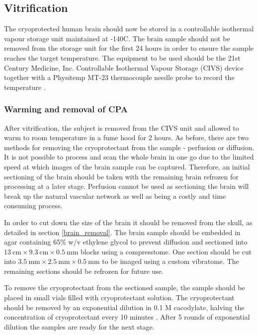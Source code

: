 \documentclass[a4paper, 11pt]{article}
\numberwithin{equation}{section}
\begin{document}
\subsection{Vitrification}

	\label{Vitrification}

The cryoprotected human brain should now be stored in a controllable isothermal vapour storage unit maintained at -140\degree C. The brain sample should not be removed from the storage unit for the first 24 hours in order to ensure the sample reaches the target temperature. The equipment to be used should be the 21st Century Medicine, Inc. Controllable Isothermal Vapour Storage (CIVS) device together with a Physitemp MT-23 thermocouple needle probe to record the temperature \cite{Aldehyde_stabilized_cryopreservation}. 

\subsubsection{Warming and removal of CPA}
	\label{Warming}

After vitrification, the subject is removed from the CIVS unit and allowed to warm to room temperature in a fume hood for 2 hours. As before, there are two methods for removing the cryoprotectant from the sample - perfusion or diffusion. It is not possible to process and scan the whole brain in one go due to the limited speed at which images of the brain sample can be captured. Therefore, an initial sectioning of the brain should be taken with the remaining brain refrozen for processing at a later stage. Perfusion cannot be used as sectioning the brain will break up the natural vascular network as well as being a costly and time consuming process.

In order to cut down the size of the brain it should be removed from the skull, as detailed in section \ref{brain_removal}. The brain sample should be embedded in agar containing 65\% w/v ethylene glycol to prevent diffusion and sectioned into $\SI{13}{\centi\meter} \times \SI{9.3}{\centi\meter} \times \SI{0.5}{\milli\meter}$ blocks using a compresstome. One section should be cut into $\SI{3.5}{\milli\meter} \times \SI{2.5}{\milli\meter} \times \SI{0.5}{\milli\meter}$ to be imaged using a custom vibratome. The remaining sections should be refrozen for future use. 

To remove the cryoprotectant from the sectioned sample, the sample should be placed in small vials filled with cryoprotectant solution. The cryoprotectant should be removed by an exponential dilution in 0.1 M cacodylate, halving the concentration of cryoprotectant every 10 minutes \cite{Aldehyde_stabilized_cryopreservation}. After 5 rounds of exponential dilution the samples are ready for the next stage.
\end{document}
